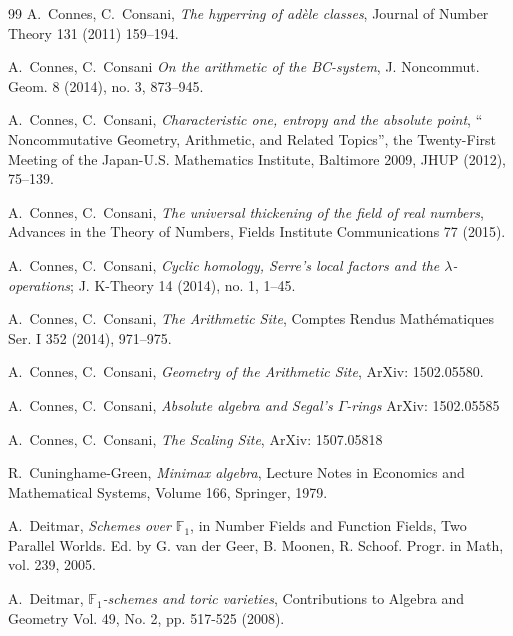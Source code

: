 \documentclass[12pt]{article}
\def\F{{\mathbb F}}
\begin{document}
\begin{thebibliography}{99}
  A.~Connes, C.~Consani, {\em The hyperring of ad\`ele classes}, Journal of Number Theory 131 (2011) 159--194.

 A.~Connes, C.~Consani  {\em On the arithmetic of the BC-system},  J. Noncommut. Geom. 8 (2014), no. 3, 873--945. 


  A.~Connes, C.~Consani,  {\em Characteristic one, entropy and the absolute point}, `` Noncommutative Geometry, Arithmetic, and Related Topics'', the Twenty-First Meeting of the Japan-U.S. Mathematics Institute, Baltimore 2009, JHUP (2012), 75--139.

  A.~Connes, C.~Consani,  {\em The universal thickening  of the field of real numbers},  Advances in the Theory of Numbers, Fields Institute Communications 77 (2015).

 A.~Connes, C.~Consani, {\em Cyclic homology, Serre's local factors and the $\lambda$-operations};  J. K-Theory 14 (2014), no. 1, 1--45.


 A.~Connes, C.~Consani, {\em The Arithmetic Site}, Comptes Rendus Math\' ematiques Ser. I 352 (2014), 971--975.



 A.~Connes, C.~Consani, {\em Geometry of the Arithmetic Site}, ArXiv: 1502.05580.


 A.~Connes, C.~Consani, {\em Absolute algebra and Segal's $\Gamma$-rings} ArXiv: 1502.05585

 A.~Connes, C.~Consani, {\em The Scaling Site}, ArXiv: 1507.05818 



 R.~Cuninghame-Green,  {\em Minimax algebra},
Lecture Notes in Economics and Mathematical Systems, Volume 166,
Springer, 1979.

  A.~Deitmar, {\em Schemes over $\F_1$}, in Number Fields and Function Fields,
Two Parallel Worlds. Ed. by G. van der Geer, B. Moonen, R. Schoof. Progr. in
Math, vol. 239, 2005.

  A.~Deitmar, {\em  $\F_1$-schemes and toric varieties},  Contributions to Algebra and Geometry Vol. 49, No. 2, pp. 517-525 (2008).






\end{thebibliography}
\end{document}
